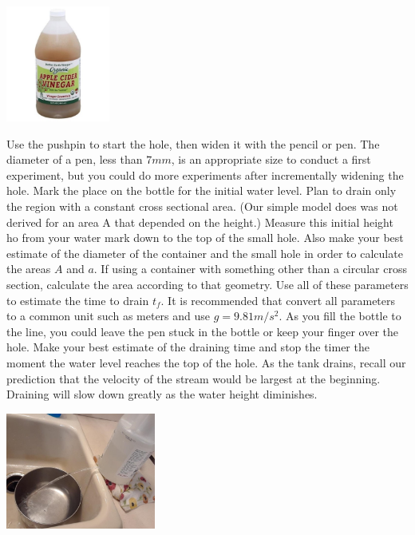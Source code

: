 \documentclass{ximera}
\begin{document}
\begin{image}
 \includegraphics[height=1.5in]{appleCider.jpg}
\end{image}

Use the pushpin to start the hole, then widen it with the pencil or pen.  The diameter of a pen, less than $7mm$, is an appropriate size to conduct a first experiment, but you could do more experiments after incrementally widening the hole.  Mark the place on the bottle for the initial water level.  Plan to drain only the region with a constant cross sectional area.  (Our simple model does was not derived for an area A that depended on the height.)  Measure this initial height ho from your water mark down to the top of the small hole.  Also make your best estimate of the diameter of the container and the small hole in order to calculate the areas $A$ and $a$.  If using a container with something other than a circular cross section, calculate the area according to that geometry.  Use all of these parameters to estimate the time to drain $t_f$.  It is recommended that convert all parameters to a common unit such as meters and use $g=9.81m/s^2$.  As you fill the bottle to the line, you could leave the pen stuck in the bottle or keep your finger over the hole.  Make your best estimate of the draining time and stop the timer the moment the water level reaches the top of the hole.  As the tank drains, recall our prediction that the velocity of the stream would be largest at the beginning.  Draining will slow down greatly as the water height diminishes.  

\begin{image}
 \includegraphics[height=1.5in]{sink.jpg}
\end{image}
\end{document}
